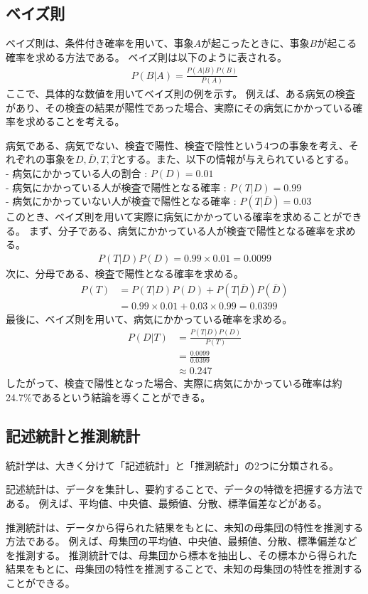 \documentclass{ltjsarticle}
\begin{document}
\newpage

\subsection{ベイズ則}
ベイズ則は、条件付き確率を用いて、事象$A$が起こったときに、事象$B$が起こる確率を求める方法である。
ベイズ則は以下のように表される。
\begin{align}
P(B|A) = \frac{P(A|B)P(B)}{P(A)}
\end{align}
ここで、具体的な数値を用いてベイズ則の例を示す。
例えば、ある病気の検査があり、その検査の結果が陽性であった場合、実際にその病気にかかっている確率を求めることを考える。
\par
病気である、病気でない、検査で陽性、検査で陰性という4つの事象を考え、それぞれの事象を$D, \bar D, T, \bar T$とする。また、以下の情報が与えられているとする。\\
- 病気にかかっている人の割合 : $P(D) = 0.01$ \\
- 病気にかかっている人が検査で陽性となる確率 : $P(T|D) = 0.99$ \\
- 病気にかかっていない人が検査で陽性となる確率 : $P(T|\bar D) = 0.03$ \\
このとき、ベイズ則を用いて実際に病気にかかっている確率を求めることができる。
まず、分子である、病気にかかっている人が検査で陽性となる確率を求める。
\begin{align}
P(T|D)P(D) = 0.99 \times 0.01 = 0.0099
\end{align}
次に、分母である、検査で陽性となる確率を求める。
\begin{align}
P(T) &= P(T|D)P(D) + P(T|\bar D)P(\bar D)\\ 
&= 0.99 \times 0.01 + 0.03 \times 0.99 = 0.0399
\end{align}
最後に、ベイズ則を用いて、病気にかかっている確率を求める。
\begin{align}
P(D|T) &= \frac{P(T|D)P(D)}{P(T)}\\
&= \frac{0.0099}{0.0399} \\
&\approx 0.247
\end{align}
したがって、検査で陽性となった場合、実際に病気にかかっている確率は約24.7\%であるという結論を導くことができる。

\newpage

\subsection{記述統計と推測統計}
統計学は、大きく分けて「記述統計」と「推測統計」の2つに分類される。
\par
記述統計は、データを集計し、要約することで、データの特徴を把握する方法である。
例えば、平均値、中央値、最頻値、分散、標準偏差などがある。
\par
推測統計は、データから得られた結果をもとに、未知の母集団の特性を推測する方法である。
例えば、母集団の平均値、中央値、最頻値、分散、標準偏差などを推測する。
推測統計では、母集団から標本を抽出し、その標本から得られた結果をもとに、母集団の特性を推測することで、未知の母集団の特性を推測することができる。
\end{document}
